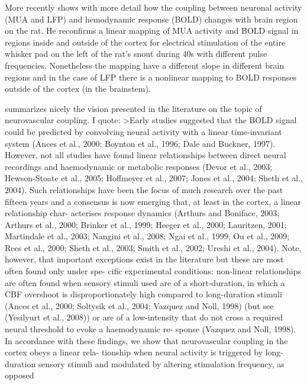 More recently \citep{devonshire_neurovascular_2012} shows with more detail how the coupling between neuronal activity (MUA and LFP) and hemodynamic response (BOLD) changes with brain region on the rat. He reconfirms a linear mapping of MUA activity and BOLD signal in regions inside and outside of the cortex for electrical stimulation of the entire whisker pad on the left of the rat's snout during 40s with different pulse frequencies. Nonetheless the mapping have a different slope in different brain regions and in the case of LFP there is a nonlinear mapping to BOLD responses outside of the cortex (in the brainstem).


\citep{devonshire_neurovascular_2012} summarizes nicely the vision presented in the literature on the topic of neurovascular coupling. I quote:
>Early studies suggested that the BOLD signal could be predicted by
convolving neural activity with a linear time-invariant system (Ances
et al., 2000; Boynton et al., 1996; Dale and Buckner, 1997). However,
not all studies have found linear relationships between direct neural
recordings and haemodynamic or metabolic responses (Devor et al.,
2003; Hewson-Stoate et al., 2005; Hoffmeyer et al., 2007; Jones
et al., 2004; Sheth et al., 2004). Such relationships have been the
focus of much research over the past fifteen years and a consensus
is now emerging that, at least in the cortex, a linear relationship char-
acterises response dynamics (Arthurs and Boniface, 2003; Arthurs
et al., 2000; Brinker et al., 1999; Heeger et al., 2000; Lauritzen,
2001; Martindale et al., 2003; Nangini et al., 2008; Ngai et al., 1999;
Ou et al., 2009; Rees et al., 2000; Sheth et al., 2003; Smith et al.,
2002; Ureshi et al., 2004). Note, however, that important exceptions
exist in the literature but these are most often found only under spe-
cific experimental conditions: non-linear relationships are often
found when sensory stimuli used are of a short-duration, in which a
CBF overshoot is disproportionately high compared to long-duration
stimuli (Ances et al., 2000; Soltysik et al., 2004; Vazquez and Noll,
1998) (but see (Yesilyurt et al., 2008)) or are of a low-intensity that
do not cross a required neural threshold to evoke a haemodynamic re-
sponse (Vazquez and Noll, 1998). In accordance with these findings,
we show that neurovascular coupling in the cortex obeys a linear rela-
tionship when neural activity is triggered by long-duration sensory
stimuli and modulated by altering stimulation frequency, as opposed
